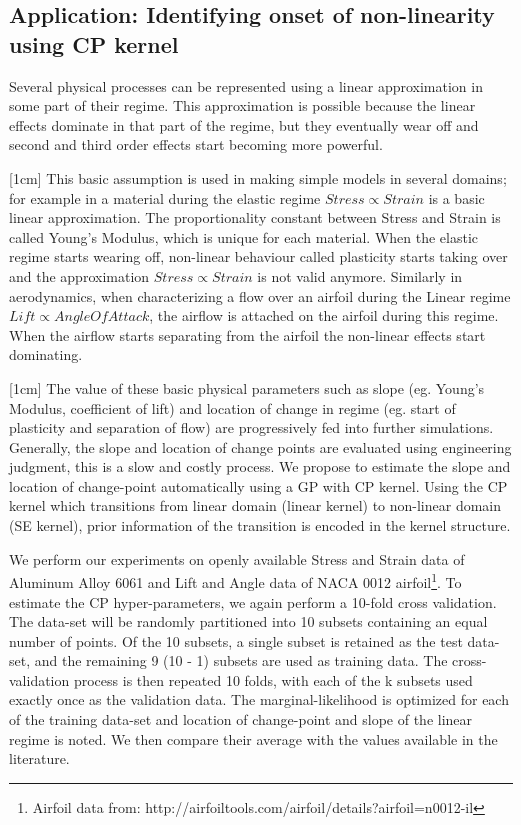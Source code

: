 \subsection{Application: Identifying onset of non-linearity  using CP kernel}\label{subsubsecCh4ApplicationCP}
Several physical processes can be represented using a linear approximation in some part of their regime. This approximation is possible because the linear effects dominate in that part of the regime, but they eventually wear off and second and third order effects start becoming more powerful. 

[1cm]
This basic assumption is used in making simple models in several domains; for example in a material during the elastic regime $Stress \propto Strain$ is a basic linear approximation. The proportionality constant between Stress and Strain is called Young's Modulus, which is unique for each material. When the elastic regime starts wearing off, non-linear behaviour called plasticity starts taking over and the approximation $Stress \propto Strain$ is not valid anymore. Similarly in aerodynamics, when characterizing a flow over an airfoil during the Linear regime  $ Lift \propto Angle Of Attack$, the airflow is attached on the airfoil during this regime. When the airflow starts separating from the airfoil the non-linear effects start dominating. 

\begin{mdframed}[hidealllines=true,backgroundcolor=blue!20]
[1cm]
The value of these basic physical parameters such as slope (eg. Young's Modulus, coefficient of lift) and location of change in regime (eg. start of plasticity and separation of flow) are progressively fed into further simulations. Generally, the slope and location of change points are evaluated using engineering judgment, this is a slow and costly process. We propose to estimate the slope and location of change-point automatically using a GP with CP kernel. Using the CP kernel which transitions from linear domain (linear kernel) to non-linear domain (SE kernel), prior information of the transition is encoded in the kernel structure. 


We perform our experiments on openly available Stress and Strain data of Aluminum Alloy 6061 \cite{kaufman1999properties} and Lift and Angle data of NACA 0012 airfoil\footnote{Airfoil data from: http://airfoiltools.com/airfoil/details?airfoil=n0012-il}. To estimate the CP hyper-parameters, we again perform a 10-fold cross validation. The data-set will be randomly partitioned into 10 subsets containing an equal number of points. Of the 10 subsets, a single subset is retained as the test data-set, and the remaining 9 (10 - 1) subsets are used as training data. The cross-validation process is then repeated 10 folds, with each of the k subsets used exactly once as the validation data. The marginal-likelihood is optimized for each of the training data-set and location of change-point and slope of the linear regime is noted. We then compare their average with the values available in the literature. 
\end{mdframed}


